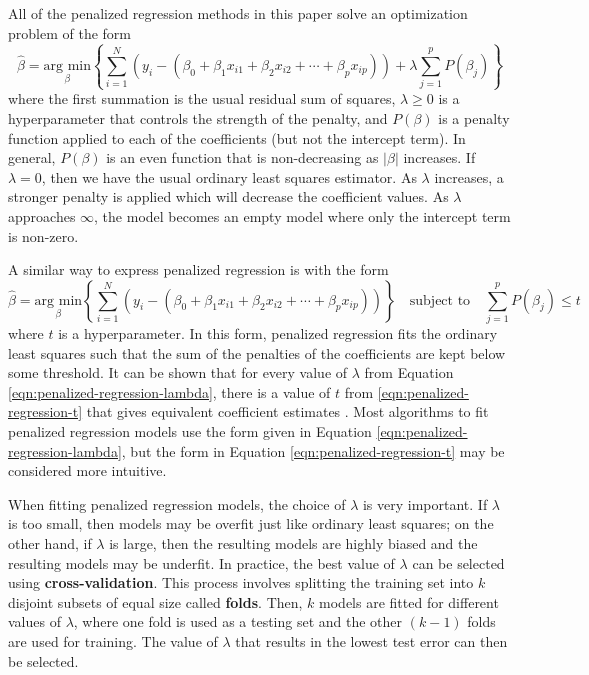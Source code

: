 \documentclass{article}
\newcommand{\argmin}[2]{\underset{#1}{\text{arg min}}\left\{#2\right\}}
\begin{document}
All of the penalized regression methods in this paper solve an optimization problem of the form
\begin{equation}\label{eqn:penalized-regression-lambda}
	\hat{\beta}=\argmin{\beta}{\sum\limits_{i = 1}^N(y_i - (\beta_0 + \beta_1 x_{i1} + \beta_2 x_{i2} + \cdots + \beta_p x_{ip})) + \lambda\sum\limits_{j = 1}^p P(\beta_j)}
\end{equation}
where the first summation is the usual residual sum of squares, $\lambda\geq 0$ is a hyperparameter that controls the strength of the penalty, and $P(\beta)$ is a penalty function applied to each of the coefficients (but not the intercept term). In general, $P(\beta)$ is an even function that is non-decreasing as $\vert \beta \vert$ increases. If $\lambda = 0$, then we have the usual ordinary least squares estimator. As $\lambda$ increases, a stronger penalty is applied which will decrease the coefficient values. As $\lambda$ approaches $\infty$, the model becomes an empty model where only the intercept term is non-zero.

A similar way to express penalized regression is with the form
\begin{equation}\label{eqn:penalized-regression-t}
	\hat{\beta} = \argmin{\beta}{\sum\limits_{i = 1}^N(y_i - (\beta_0 + \beta_1 x_{i1} + \beta_2 x_{i2} + \cdots + \beta_p x_{ip}))} \quad \text{subject to} \quad \sum\limits_{j = 1}^p P(\beta_j)\leq t
\end{equation}
where $t$ is a hyperparameter. In this form, penalized regression fits the ordinary least squares such that the sum of the penalties of the coefficients are kept below some threshold. It can be shown that for every value of $\lambda$ from Equation \ref{eqn:penalized-regression-lambda}, there is a value of $t$ from \ref{eqn:penalized-regression-t} that gives equivalent coefficient estimates \cite{james2017islr}. Most algorithms to fit penalized regression models use the form given in Equation \ref{eqn:penalized-regression-lambda}, but the form in Equation \ref{eqn:penalized-regression-t} may be considered more intuitive.

When fitting penalized regression models, the choice of $\lambda$ is very important. If $\lambda$ is too small, then models may be overfit just like ordinary least squares; on the other hand, if $\lambda$ is large, then the resulting models are highly biased and the resulting models may be underfit. In practice, the best value of $\lambda$ can be selected using \textbf{cross-validation}. This process involves splitting the training set into $k$ disjoint subsets of equal size called \textbf{folds}. Then, $k$ models are fitted for different values of $\lambda$, where one fold is used as a testing set and the other $(k - 1)$ folds are used for training. The value of $\lambda$ that results in the lowest test error can then be selected.
\end{document}
